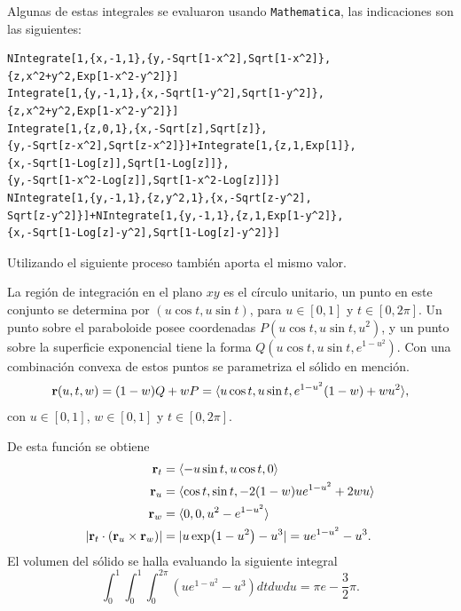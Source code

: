 Algunas de estas integrales se evaluaron usando \verb|Mathematica|, las indicaciones son las siguientes:

\begin{tcolorbox}[title=\bf Instrucción en \verb"Mathematica"]\begin{Verbatim}[formatcom=\letraverbatim]
NIntegrate[1,{x,-1,1},{y,-Sqrt[1-x^2],Sqrt[1-x^2]},
{z,x^2+y^2,Exp[1-x^2-y^2]}]
Integrate[1,{y,-1,1},{x,-Sqrt[1-y^2],Sqrt[1-y^2]},
{z,x^2+y^2,Exp[1-x^2-y^2]}]
Integrate[1,{z,0,1},{x,-Sqrt[z],Sqrt[z]},
{y,-Sqrt[z-x^2],Sqrt[z-x^2]}]+Integrate[1,{z,1,Exp[1]},
{x,-Sqrt[1-Log[z]],Sqrt[1-Log[z]]},
{y,-Sqrt[1-x^2-Log[z]],Sqrt[1-x^2-Log[z]]}]
NIntegrate[1,{y,-1,1},{z,y^2,1},{x,-Sqrt[z-y^2],
Sqrt[z-y^2]}]+NIntegrate[1,{y,-1,1},{z,1,Exp[1-y^2]},
{x,-Sqrt[1-Log[z]-y^2],Sqrt[1-Log[z]-y^2]}]
\end{Verbatim}
\end{tcolorbox}

Utilizando el siguiente proceso también aporta el mismo valor.


La región de integración en el plano $xy$ es el círculo unitario, un punto en este conjunto se determina por {\small $(u\cos t,u\sin t)$,} para $u\in [0,1]$ y {\small $t\in [0,2\pi]$.}
Un punto sobre el paraboloide posee coordenadas {\small $P( u\cos t,u\sin t,u^{2})$,}
y un punto sobre la superficie exponencial tiene la forma
{\small $Q(u\cos t,u\sin t,e^{1-u^{2}})$.} Con una combinación convexa de estos puntos se parametriza el sólido en mención.
\begin{multline*}
{\bf r}( u,t,w) = (1-w) Q +wP = \langle u\cos t,u\sin t,e^{1-u^{2}}( 1-w) +wu^{2}\rangle,
\end{multline*}
con $u\in [0,1]$, $w\in [0,1]$ y $t\in [0,2\pi ]$.

De esta función se obtiene
\begin{align*}
{\bf r}_{t} &= \langle -u\sin t,u\cos t,0\rangle \\
{\bf r}_{u} &=\langle \cos t,\sin t,-2( 1-w)
ue^{1-u^{2}}+2wu\rangle \\
{\bf r}_{w}&= \langle 0,0,u^{2}-e^{1-u^{2}}\rangle \\
|{\bf r}_{t}\cdot ({\bf r}_{u}\times {\bf r}_{w})| &= |u\exp(1-u^{2})-u^{3}|=ue^{1-u^{2}}-u^{3}.
\end{align*}
%
El volumen del sólido se halla evaluando la siguiente integral
\[\int_{0}^{1}\int_{0}^{1}\int_{0}^{2\pi }( ue^{1-u^{2}}-u^{3})
dtdwdu= \pi e-\frac{3}{2}\pi.\]
%

